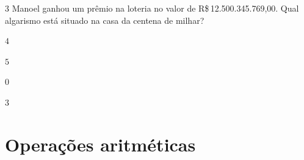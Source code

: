 





\num{3} Manoel ganhou um prêmio na loteria no valor de R\$\,12.500.345.769,00.
Qual algarismo está situado na casa da centena de milhar?

\begin{escolha}[itemsep=0pt]
\item $4$
\item $5$
\item $0$
\item $3$
\end{escolha}








\chapter{Operações
aritméticas}

